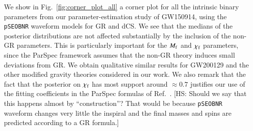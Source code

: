 \documentclass[twocolumn,
               prd,
               aps,
               superscriptaddress,
               tightenlines,
               nofootinbib,
               eqsecnum,
               amsfonts,
               amsmath,
               longbibliography]{revtex4-1}
\newcommand{\Mf}{M_{\rm f}}
\newcommand{\pSEOB}{\texttt{pSEOBNR}}
\newcommand{\hscomm}[1]{{\textcolor{TealBlue}{{[HS: #1]}}}}
\begin{document}
We show in Fig.~\ref{fig:corner_plot_all} a corner plot for all the intrinsic
binary parameters from our parameter-estimation study of GW150914, using the
\pSEOB{} waveform models for GR and dCS.
%
We see that the medians of the posterior distributions are not affected substantially by the inclusion of the non-GR parameters.
%
This is particularly important for the $\Mf$ and $\chi_{\rm f}$ parameters, since
the ParSpec framework assumes that the non-GR theory induces small deviations from GR.
%
We obtain qualitative similar results for GW200129 and the other modified gravity theories considered in our work.
%
We also remark that the fact that the posterior on $\chi_{\rm f}$ has most support around $\approx 0.7$ justifies our use
of the fitting coefficients in the ParSpec formulas of Ref.~\cite{Maselli:2019mjd}.
%
\hscomm{Should we say that this happens almost by ``construction''? That would be because \pSEOB{} waveform changes very little the inspiral
and the final masses and spins are predicted according to a GR formula.}
\end{document}
